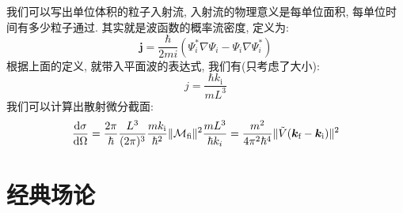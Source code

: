 我们可以写出单位体积的粒子入射流, 入射流的物理意义是每单位面积, 每单位时间有多少粒子通过.
其实就是波函数的概率流密度, 定义为:
\begin{equation}
  \bm{j}=\frac{\hbar}{2 m i}\left(\Psi_i^* \nabla \Psi_i-\Psi_i \nabla \Psi_i^*\right)
\end{equation}
根据上面的定义, 就带入平面波的表达式, 我们有(只考虑了大小):
\begin{equation}
  j = \frac{\hbar k_{\text{i}}}{mL^3}
\end{equation}
我们可以计算出散射微分截面:
\begin{equation}
  \dv{\sigma}{\Omega} = \frac{2\pi}{\hbar} \frac{L^3}{(2\pi)^3} \frac{m k_{\text{i}}}{\hbar^2} \|\mathcal{M}_{\text{fi}}\|^2 \frac{m L^3}{\hbar k_i} = \frac{m^2}{4\pi^2 \hbar^4} \|\tilde{V}(\bm{k}_{\text{f}} - \bm{k}_{\text{i}})\|^2
\end{equation}


\section{经典场论}
\label{CH1 S6 Classical field theory}








